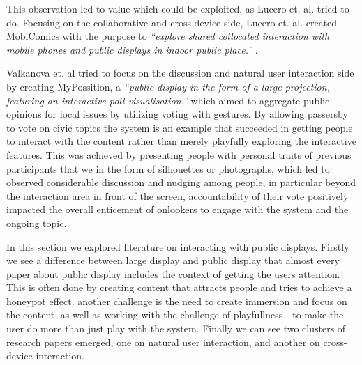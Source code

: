This observation led to value which could be exploited, as Lucero et. al. tried to do. 
Focusing on the collaborative and cross-device side, Lucero et. al. created MobiComics with the purpose to \emph{``explore shared collocated interaction with mobile phones and public displays in indoor public place.''} \cite{Lucero:2012}. 

Valkanova et. al tried to focus on the discussion and natural user interaction side by creating MyPossition, a \emph{``public display in the form of a large projection, featuring an interactive poll visualisation.''} \cite{Valkanova:2014} which aimed to aggregate public opinions for local issues by utilizing voting with gestures. By allowing passersby to vote on civic topics the system is an example that succeeded in getting people to interact with the content rather than merely playfully exploring the interactive features. This was achieved by presenting people with personal traits of previous participants that we in the form of silhouettes or photographs, which led to observed considerable discussion and nudging among people, in particular beyond the interaction area in front of the screen, accountability of their vote positively impacted the overall enticement of onlookers to engage with the system and the ongoing topic.

In this section we explored literature on interacting with public displays. Firstly we see a difference between large display and public display that almost every paper about public display includes the context of getting the users attention. This is often done by creating content that attracts people and tries to achieve a honeypot effect. another challenge  is the need to create immersion and focus on the content, as well as  working with the challenge of playfullness - to make the user do more than just play with the system. Finally we can see two clusters of research papers emerged, one on natural user interaction, and another on cross-device interaction.

